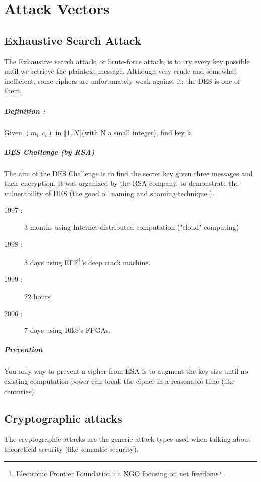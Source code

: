 \chapter{Attack Vectors}


\section{Exhaustive Search Attack}
    The Exhaustive search attack, or brute-force attack, is to try every key possible until we retrieve the plaintext message. Although very crude and somewhat inefficient, some ciphers are unfortunately weak against it: the DES is one of them.
    
\paragraph{Definition :}
Given $(m_i,c_i)$ in $\llbracket 1,N \rrbracket$(with N a small integer), find key k.

\paragraph{DES Challenge (by RSA)\\}
The aim of the DES Challenge is to find the secret key given three messages and their encryption. It was organized by the RSA company, to demonstrate the vulnerability of DES (the good ol' naming and shaming technique ).

\begin{description}
\item[1997 : ] 3 months using Internet-distributed computation ("cloud" computing)
\item[1998 : ] 3 days using EFF\footnote{Electronic Frontier Foundation : a NGO focusing on net freedom}'s deep crack machine.
\item[1999 : ] 22 hours
\item[2006 : ] 7 days using 10k\$'s FPGAs.
\end{description}

\paragraph{Prevention}
You only way to prevent a cipher from ESA is to augment the key size until no existing computation power can break the cipher in a reasonable time (like centuries).

\section{Cryptographic attacks}
The cryptographic attacks are the generic attack types used when talking about theoretical security (like semantic security).

